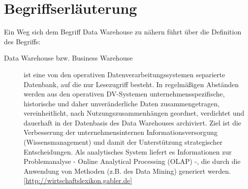 \section{Begriffserläuterung}
Ein Weg sich dem Begriff Data Warehouse zu nähern führt über die Definition des Begriffs: \begin{description}
	\item [Data Warehouse bzw. Business Warehouse] ist eine von den operativen Datenverarbeitungssystemen separierte Datenbank, auf die nur Lesezugriff besteht. In regelmäßigen Abständen werden aus den operativen DV-Systemen unternehmensspezifische, historische und daher unveränderliche Daten zusammengetragen, vereinheitlicht, nach Nutzungszusammenhängen geordnet, verdichtet und dauerhaft in der Datenbasis des Data Warehouses archiviert. Ziel ist die Verbesserung der unternehmensinternen Informationsversorgung (Wissensmanagement) und damit der Unterstützung strategischer Entscheidungen. Als analytisches System liefert es Informationen zur Problemanalyse - Online Analytical Processing (OLAP) -, die durch die Anwendung von Methoden (z.B. des Data Mining) generiert werden.  \href{http://wirtschaftslexikon.gabler.de/Definition/data-warehouse.html?referenceKeywordName=Business+Warehouse}{[http://wirtschaftslexikon.gabler.de]}
\end{description}

